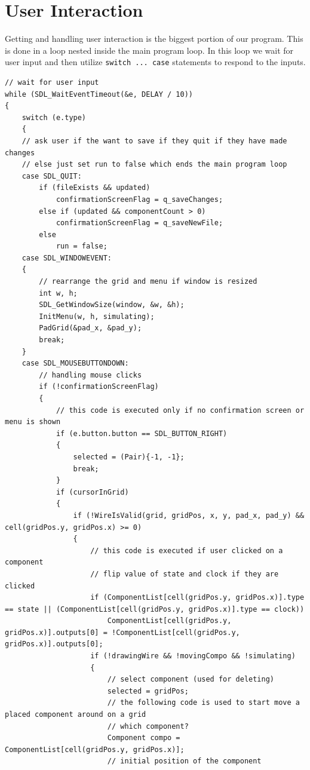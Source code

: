 \documentclass[report]{subfiles}
\begin{document}
    \section{User Interaction}
    Getting and handling user interaction is the biggest portion of our program. This is done in a loop nested inside the main program loop. In this loop we wait for user input and then utilize \texttt{switch ... case} statements to respond to the inputs.
\begin{lstlisting}
// wait for user input
while (SDL_WaitEventTimeout(&e, DELAY / 10))
{
    switch (e.type)
    {
    // ask user if the want to save if they quit if they have made changes
    // else just set run to false which ends the main program loop
    case SDL_QUIT:
        if (fileExists && updated)
            confirmationScreenFlag = q_saveChanges;
        else if (updated && componentCount > 0)
            confirmationScreenFlag = q_saveNewFile;
        else
            run = false;
    case SDL_WINDOWEVENT:
    {
        // rearrange the grid and menu if window is resized
        int w, h;
        SDL_GetWindowSize(window, &w, &h);
        InitMenu(w, h, simulating);
        PadGrid(&pad_x, &pad_y);
        break;
    }
    case SDL_MOUSEBUTTONDOWN:
        // handling mouse clicks
        if (!confirmationScreenFlag)
        {
            // this code is executed only if no confirmation screen or menu is shown
            if (e.button.button == SDL_BUTTON_RIGHT)
            {
                selected = (Pair){-1, -1};
                break;
            }
            if (cursorInGrid)
            {
                if (!WireIsValid(grid, gridPos, x, y, pad_x, pad_y) && cell(gridPos.y, gridPos.x) >= 0)
                {
                    // this code is executed if user clicked on a component
                    // flip value of state and clock if they are clicked
                    if (ComponentList[cell(gridPos.y, gridPos.x)].type == state || (ComponentList[cell(gridPos.y, gridPos.x)].type == clock))
                        ComponentList[cell(gridPos.y, gridPos.x)].outputs[0] = !ComponentList[cell(gridPos.y, gridPos.x)].outputs[0];
                    if (!drawingWire && !movingCompo && !simulating)
                    {
                        // select component (used for deleting)
                        selected = gridPos;
                        // the following code is used to start move a placed component around on a grid
                        // which component?
                        Component compo = ComponentList[cell(gridPos.y, gridPos.x)];
                        // initial position of the component

\end{lstlisting}
\end{document}
